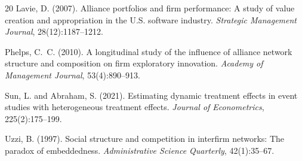 \documentclass[11pt,letterpaper]{article}
\begin{document}
\begin{thebibliography}{20}
Lavie, D. (2007).
\newblock Alliance portfolios and firm performance: A study of value
creation and appropriation in the U.S. software industry.
\newblock \emph{Strategic Management Journal}, 28(12):1187--1212.

Phelps, C.~C. (2010).
\newblock A longitudinal study of the influence of alliance network
structure and composition on firm exploratory innovation.
\newblock \emph{Academy of Management Journal}, 53(4):890--913.

Sun, L. and Abraham, S. (2021).
\newblock Estimating dynamic treatment effects in event studies with
heterogeneous treatment effects.
\newblock \emph{Journal of Econometrics}, 225(2):175--199.

Uzzi, B. (1997).
\newblock Social structure and competition in interfirm networks: The
paradox of embeddedness.
\newblock \emph{Administrative Science Quarterly}, 42(1):35--67.

\end{thebibliography}
\end{document}
